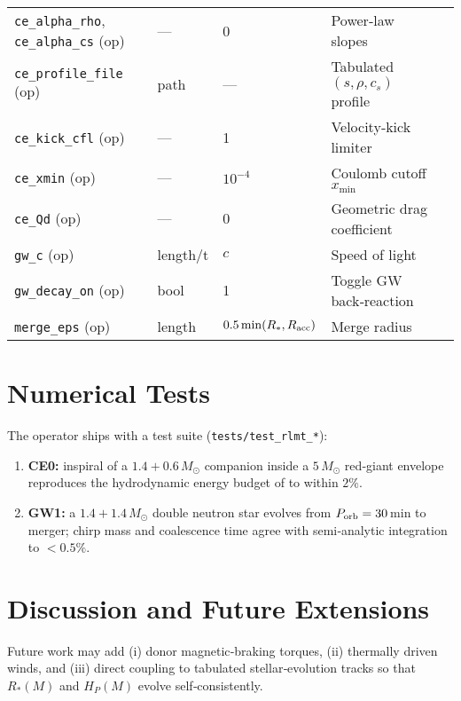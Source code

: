 \documentclass[11pt]{article}
\begin{document}
\begin{table}[h]
\begin{tabular}{@{}lllll@{}}
\texttt{ce\_alpha\_rho}, \texttt{ce\_alpha\_cs} (op) & — & 0 & Power‑law slopes\\
\texttt{ce\_profile\_file}  (op) & path & — & Tabulated $(s,\rho,c_s)$ profile\\
\texttt{ce\_kick\_cfl}      (op) & — & 1 & Velocity‑kick limiter\\
\texttt{ce\_xmin}           (op) & — & $10^{-4}$ & Coulomb cutoff $x_{\min}$\\
\texttt{ce\_Qd}             (op) & — & 0 & Geometric drag coefficient\\[0.2em]
%
\texttt{gw\_c}              (op) & length/t & $c$ & Speed of light\\
\texttt{gw\_decay\_on}      (op) & bool & 1 & Toggle GW back‑reaction\\[0.2em]
%
\texttt{merge\_eps}         (op) & length & $0.5\min(R_*,R_{\rm acc})$ & Merge radius\\
\bottomrule
\end{tabular}
\end{table}

\section{Numerical Tests}
\label{sec:tests}
The operator ships with a test suite (\texttt{tests/test\_rlmt\_*}):

\begin{enumerate}[nosep]
\item \textbf{CE0:} inspiral of a $1.4+0.6\,M_\odot$ companion inside a
      $5\,M_\odot$ red‑giant envelope reproduces the hydrodynamic energy
      budget of \citet{Fragos2019} to within $2\%$.
\item \textbf{GW1:} a $1.4+1.4\,M_\odot$ double neutron star evolves from
      $P_{\rm orb}=30$ min to merger; chirp mass and coalescence time agree
      with semi‑analytic integration to $<0.5\%$.
\end{enumerate}

\section{Discussion and Future Extensions}
\label{sec:future}
Future work may add
(i) donor magnetic‑braking torques,
(ii) thermally driven winds, and
(iii) direct coupling to tabulated stellar‑evolution tracks
so that $R_*(M)$ and $H_P(M)$ evolve self‑consistently.
\end{document}
